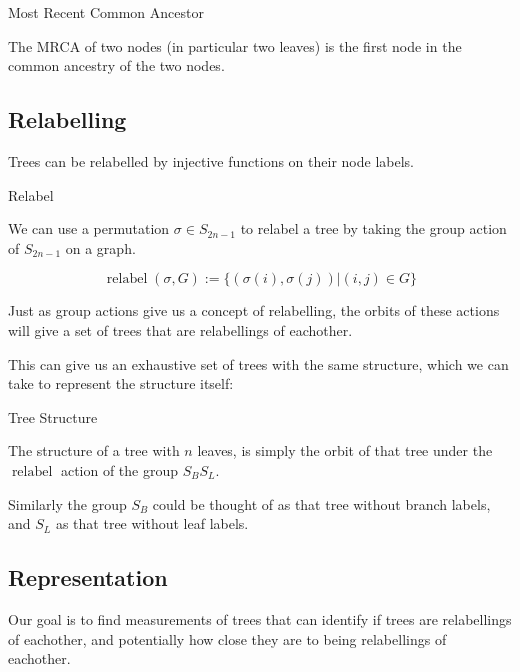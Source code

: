 \documentclass{article}
\DeclareMathOperator{\relabel}{relabel}
\begin{document}
\begin{definition} Most Recent Common Ancestor

	The MRCA of two nodes (in particular two leaves) is the first node in the
	common ancestry of the two nodes.
\end{definition}


\subsection{Relabelling}

Trees can be relabelled by injective functions on their node labels.

\begin{definition} Relabel

	We can use a permutation $\sigma \in S_{2n-1}$ to relabel a tree by taking
	the group action of $S_{2n-1}$ on a graph.

	\[
		\relabel(\sigma, G) := \{(\sigma(i), \sigma(j)) | (i, j) \in G\}
	\]
\end{definition}

Just as group actions give us a concept of relabelling, the orbits of these
actions will give a set of trees that are relabellings of eachother.

This can give us an exhaustive set of trees with the same structure, which we
can take to represent the structure itself:

\begin{definition} Tree Structure

	The structure of a tree with $n$ leaves, is simply the orbit of that tree
	under the $\relabel$ action of the group ${S_B}{S_L}$.

	Similarly the group $S_B$ could be thought of as that tree without branch
	labels, and $S_L$ as that tree without leaf labels.
\end{definition}

\subsection{Representation}

Our goal is to find measurements of trees that can identify if trees are
relabellings of eachother, and potentially how close they are to being
relabellings of eachother.
\end{document}
